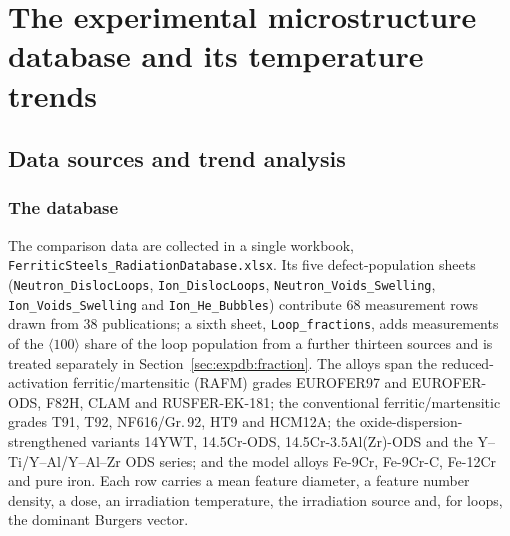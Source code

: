%
%
%

\section{The experimental microstructure database and its temperature trends}
\label{sec:expdb}

\subsection{Data sources and trend analysis}
\label{sec:expdb:sources}

\subsubsection*{The database}

The comparison data are collected in a single workbook,
\texttt{FerriticSteels\_RadiationDatabase.xlsx}. Its five defect-population sheets
(\texttt{Neutron\_DislocLoops}, \texttt{Ion\_DislocLoops},
\texttt{Neutron\_Voids\_Swelling}, \texttt{Ion\_Voids\_Swelling} and
\texttt{Ion\_He\_Bubbles}) contribute $68$ measurement rows drawn from $38$
publications; a sixth sheet, \texttt{Loop\_fractions}, adds measurements of the
$\langle 100\rangle$ share of the loop population from a further thirteen sources
and is treated separately in Section~\ref{sec:expdb:fraction}. The alloys span the reduced-activation ferritic/martensitic (RAFM)
grades EUROFER97 and EUROFER-ODS, F82H, CLAM and RUSFER\hbox{-}EK\hbox{-}181; the
conventional ferritic/martensitic grades T91, T92, NF616/Gr.\,92, HT9 and HCM12A;
the oxide-dispersion-strengthened variants 14YWT, 14.5Cr-ODS,
14.5Cr-3.5Al(Zr)-ODS and the Y--Ti/Y--Al/Y--Al--Zr ODS series; and the model
alloys Fe-9Cr, Fe-9Cr-C, Fe-12Cr and pure iron. Each row carries a mean feature
diameter, a feature number density, a dose, an irradiation temperature, the
irradiation source and, for loops, the dominant Burgers vector.

